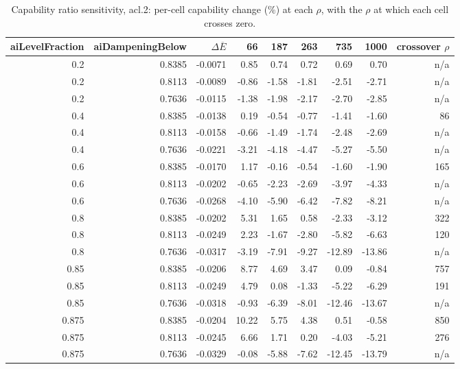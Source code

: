 \begin{table}[htbp]
  \centering
  \caption{Capability ratio sensitivity, acl.2: per-cell capability change (\%) at each $\rho$, with the $\rho$ at which each cell crosses zero.}
  \label{tab:rho-acl-2-cells}
  \begin{tabular}{r r r r r r r r r}
    \toprule
    aiLevelFraction & aiDampeningBelow & $\Delta\overline{E}$ & 66 & 187 & 263 & 735 & 1000 & crossover $\rho$ \\
    \midrule
    0.2 & 0.8385 & -0.0071 & 0.85 & 0.74 & 0.72 & 0.69 & 0.70 & n/a \\
    0.2 & 0.8113 & -0.0089 & -0.86 & -1.58 & -1.81 & -2.51 & -2.71 & n/a \\
    0.2 & 0.7636 & -0.0115 & -1.38 & -1.98 & -2.17 & -2.70 & -2.85 & n/a \\
    0.4 & 0.8385 & -0.0138 & 0.19 & -0.54 & -0.77 & -1.41 & -1.60 & 86 \\
    0.4 & 0.8113 & -0.0158 & -0.66 & -1.49 & -1.74 & -2.48 & -2.69 & n/a \\
    0.4 & 0.7636 & -0.0221 & -3.21 & -4.18 & -4.47 & -5.27 & -5.50 & n/a \\
    0.6 & 0.8385 & -0.0170 & 1.17 & -0.16 & -0.54 & -1.60 & -1.90 & 165 \\
    0.6 & 0.8113 & -0.0202 & -0.65 & -2.23 & -2.69 & -3.97 & -4.33 & n/a \\
    0.6 & 0.7636 & -0.0268 & -4.10 & -5.90 & -6.42 & -7.82 & -8.21 & n/a \\
    0.8 & 0.8385 & -0.0202 & 5.31 & 1.65 & 0.58 & -2.33 & -3.12 & 322 \\
    0.8 & 0.8113 & -0.0249 & 2.23 & -1.67 & -2.80 & -5.82 & -6.63 & 120 \\
    0.8 & 0.7636 & -0.0317 & -3.19 & -7.91 & -9.27 & -12.89 & -13.86 & n/a \\
    0.85 & 0.8385 & -0.0206 & 8.77 & 4.69 & 3.47 & 0.09 & -0.84 & 757 \\
    0.85 & 0.8113 & -0.0249 & 4.79 & 0.08 & -1.33 & -5.22 & -6.29 & 191 \\
    0.85 & 0.7636 & -0.0318 & -0.93 & -6.39 & -8.01 & -12.46 & -13.67 & n/a \\
    0.875 & 0.8385 & -0.0204 & 10.22 & 5.75 & 4.38 & 0.51 & -0.58 & 850 \\
    0.875 & 0.8113 & -0.0245 & 6.66 & 1.71 & 0.20 & -4.03 & -5.21 & 276 \\
    0.875 & 0.7636 & -0.0329 & -0.08 & -5.88 & -7.62 & -12.45 & -13.79 & n/a \\
    \bottomrule
  \end{tabular}
\end{table}
